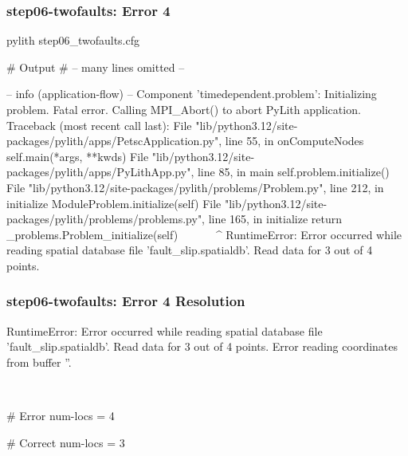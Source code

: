 \documentclass[aspectratio=169]{beamer}
\begin{document}
\begin{frame}[fragile]
  \frametitle{{\ttfamily step06-twofaults}: Error 4}

\begin{pyrejournal}
pylith step06_twofaults.cfg

# Output
# -- many lines omitted --

 -- info (application-flow)
 -- Component 'timedependent.problem': Initializing problem.
Fatal error. Calling MPI_Abort() to abort PyLith application.
Traceback (most recent call last):
  File "lib/python3.12/site-packages/pylith/apps/PetscApplication.py", line 55, in onComputeNodes
    self.main(*args, **kwds)
  File "lib/python3.12/site-packages/pylith/apps/PyLithApp.py", line 85, in main
    self.problem.initialize()
  File "lib/python3.12/site-packages/pylith/problems/Problem.py", line 212, in initialize
    ModuleProblem.initialize(self)
  File "lib/python3.12/site-packages/pylith/problems/problems.py", line 165, in initialize
    return _problems.Problem_initialize(self)
           ^^^^^^^^^^^^^^^^^^^^^^^^^^^^^^^^^^
RuntimeError: Error occurred while reading spatial database file 'fault_slip.spatialdb'.
Read data for 3 out of 4 points.
\end{pyrejournal}

\end{frame}


\begin{frame}[t,fragile]
  \frametitle{{\ttfamily step06-twofaults}: Error 4 Resolution}

  \tserror
  \begin{pyrejournal}
RuntimeError: Error occurred while reading spatial database file 'fault_slip.spatialdb'.
Read data for 3 out of 4 points.
Error reading coordinates from buffer ''.
  \end{pyrejournal}

  \pause\\[1pt]

  \begin{cfgcode}
    # Error
    num-locs = 4

    # Correct
    num-locs = 3
  \end{cfgcode}

\end{frame}
\end{document}
